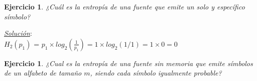 \documentclass{beamer}
\newtheorem{ejercicio} [Corolario]{Ejercicio}
\begin{document}
\begin{frame}  \small

\begin{ejercicio}

¿Cuál es la entropía de una fuente que emite un solo y específico símbolo?

\end{ejercicio}

\pause

\textit{\underline{Solución}}: \\
$H_2(p_1)$	= $p_1 \times log_2(\frac{1}{p_1}) = 1 \times log_2(1/1)= 1 \times 0 =0 $


\end{frame} 
\begin{frame}  \small

\begin{ejercicio}

¿Cual es la entropía de una fuente sin memoria que emite símbolos de un alfabeto de tamaño $m$, siendo cada símbolo igualmente probable?

\end{ejercicio}

\pause


\end{frame}
\end{document}
